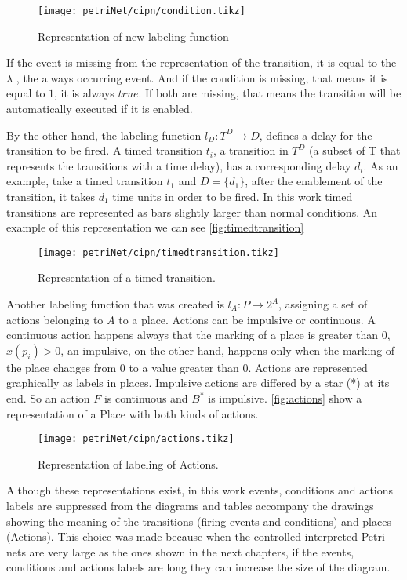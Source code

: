 \begin{figure}[H]
  \centering \texttt{[image: petriNet/cipn/condition.tikz]}
  \caption{Representation of new labeling function}
  \label{fig:condition}
\end{figure}

If the event is missing from the representation of the transition, it is equal
to the $\lambda$
, the always occurring event. And if the condition is missing, that means it is
equal to $1$, it is always $true$. If both are missing, that means the
transition will be automatically executed if it is enabled. 

By the other hand, the labeling function $l_D : T^D \rightarrow D$, defines a delay for the
transition to be fired. A timed transition $t_i$, a transition in $T^D$ (a subset of T
that represents the transitions with a time delay), has a corresponding delay
$d_i$. As an example, take a timed transition $t_1$ and $D=\{d_1\}$, after the
enablement of the transition, it takes $d_1$ time units in order to be fired. In
this work timed transitions are represented as bars slightly larger than normal
conditions. An example of this representation we can see \autoref{fig:timedtransition}

\begin{figure}[H]
  \centering \texttt{[image: petriNet/cipn/timedtransition.tikz]}
  \caption{Representation of a timed transition.}
  \label{fig:timedtransition}
\end{figure}
Another labeling function that was created is $l_A : P\rightarrow 2^A$,
assigning a set of actions belonging to $A$ to a place. Actions can be impulsive or continuous. A
continuous action happens always that the marking of a place is greater than 0,
$x(p_i)>0$, an impulsive, on the other hand, happens only when the marking of
the place changes from 0 to a value greater than 0. 
Actions are represented graphically as labels in places. Impulsive actions are differed by a star (*) at its end. So an action $F$ is
continuous and $B^*$ is impulsive. 
\autoref{fig:actions} show a representation of a Place with both kinds of actions.
\begin{figure}[H]
  \centering \texttt{[image: petriNet/cipn/actions.tikz]}
  \caption{Representation of labeling of Actions.}
  \label{fig:actions}
\end{figure}

Although these representations exist, in this work events, conditions and
actions labels are suppressed from the diagrams and tables accompany the drawings
showing the meaning of the transitions (firing events and conditions) and places
(Actions). This choice was made because when the controlled interpreted Petri nets
are very
large as the ones shown in the next chapters, if the events, conditions and
actions labels are long they can increase the size of the
diagram.


